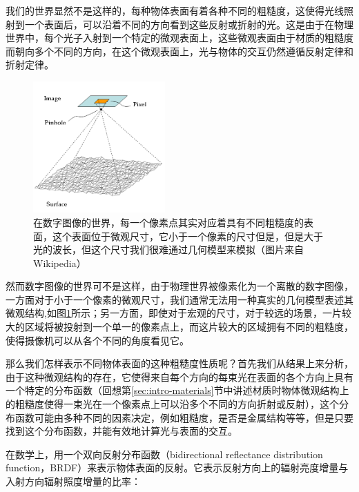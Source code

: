 我们的世界显然不是这样的，每种物体表面有着各种不同的粗糙度，这使得光线照射到一个表面后，可以沿着不同的方向看到这些反射或折射的光。这是由于在物理世界中，每个光子入射到一个特定的微观表面上，这些微观表面由于材质的粗糙度而朝向多个不同的方向，在这个微观表面上，光与物体的交互仍然遵循反射定律和折射定律。

\begin{figure}
\sidecaption
	\includegraphics[width=0.45\textwidth]{figures/intro/surface-roughness}
	\caption{在数字图像的世界，每一个像素点其实对应着具有不同粗糙度的表面，这个表面位于微观尺寸，它小于一个像素的尺寸但是，但是大于光的波长，但这个尺寸我们很难通过几何模型来模拟（图片来自Wikipedia）}
	\label{f:intro-surface-roughness}
\end{figure}

然而数字图像的世界可不是这样，由于物理世界被像素化为一个离散的数字图像，一方面对于小于一个像素的微观尺寸，我们通常无法用一种真实的几何模型表述其微观结构,如图\ref{f:intro-surface-roughness}所示；另一方面，即使对于宏观的尺寸，对于较远的场景，一片较大的区域将被投射到一个单一的像素点上，而这片较大的区域拥有不同的粗糙度，使得摄像机可以从各个不同的角度看见它。

那么我们怎样表示不同物体表面的这种粗糙度性质呢？首先我们从结果上来分析，由于这种微观结构的存在，它使得来自每个方向的每束光在表面的各个方向上具有一个特定的分布函数（回想第\ref{sec:intro-materials}节中讲述材质时物体微观结构上的粗糙度使得一束光在一个像素点上可以沿多个不同的方向折射或反射），这个分布函数可能由多种不同的因素决定，例如粗糙度，是否是金属结构等等，但是只要找到这个分布函数，并能有效地计算光与表面的交互。

在数学上，用一个双向反射分布函数（bidirectional reflectance distribution function，BRDF）\cite{a:DirectionalReflectanceandEmissivityofanOpaqueSurface}来表示物体表面的反射。它表示反射方向上的辐射亮度增量与入射方向辐射照度增量的比率：

